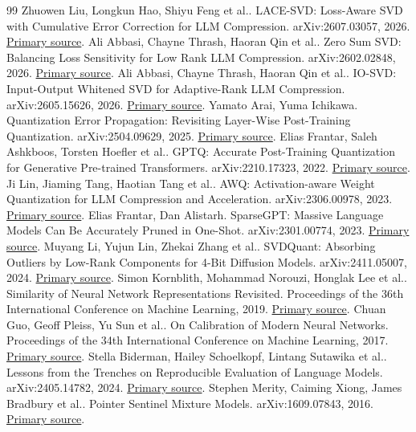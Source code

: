\documentclass[conference]{IEEEtran}
\begin{document}
\begin{thebibliography}{99}
 Zhuowen Liu, Longkun Hao, Shiyu Feng et al.. LACE-SVD: Loss-Aware SVD with Cumulative Error Correction for LLM Compression. arXiv:2607.03057, 2026. \href{https://arxiv.org/abs/2607.03057}{Primary source}.
 Ali Abbasi, Chayne Thrash, Haoran Qin et al.. Zero Sum SVD: Balancing Loss Sensitivity for Low Rank LLM Compression. arXiv:2602.02848, 2026. \href{https://arxiv.org/abs/2602.02848}{Primary source}.
 Ali Abbasi, Chayne Thrash, Haoran Qin et al.. IO-SVD: Input-Output Whitened SVD for Adaptive-Rank LLM Compression. arXiv:2605.15626, 2026. \href{https://arxiv.org/abs/2605.15626}{Primary source}.
 Yamato Arai, Yuma Ichikawa. Quantization Error Propagation: Revisiting Layer-Wise Post-Training Quantization. arXiv:2504.09629, 2025. \href{https://arxiv.org/abs/2504.09629}{Primary source}.
 Elias Frantar, Saleh Ashkboos, Torsten Hoefler et al.. GPTQ: Accurate Post-Training Quantization for Generative Pre-trained Transformers. arXiv:2210.17323, 2022. \href{https://arxiv.org/abs/2210.17323}{Primary source}.
 Ji Lin, Jiaming Tang, Haotian Tang et al.. AWQ: Activation-aware Weight Quantization for LLM Compression and Acceleration. arXiv:2306.00978, 2023. \href{https://arxiv.org/abs/2306.00978}{Primary source}.
 Elias Frantar, Dan Alistarh. SparseGPT: Massive Language Models Can Be Accurately Pruned in One-Shot. arXiv:2301.00774, 2023. \href{https://arxiv.org/abs/2301.00774}{Primary source}.
 Muyang Li, Yujun Lin, Zhekai Zhang et al.. SVDQuant: Absorbing Outliers by Low-Rank Components for 4-Bit Diffusion Models. arXiv:2411.05007, 2024. \href{https://arxiv.org/abs/2411.05007}{Primary source}.
 Simon Kornblith, Mohammad Norouzi, Honglak Lee et al.. Similarity of Neural Network Representations Revisited. Proceedings of the 36th International Conference on Machine Learning, 2019. \href{https://proceedings.mlr.press/v97/kornblith19a.html}{Primary source}.
 Chuan Guo, Geoff Pleiss, Yu Sun et al.. On Calibration of Modern Neural Networks. Proceedings of the 34th International Conference on Machine Learning, 2017. \href{https://proceedings.mlr.press/v70/guo17a.html}{Primary source}.
 Stella Biderman, Hailey Schoelkopf, Lintang Sutawika et al.. Lessons from the Trenches on Reproducible Evaluation of Language Models. arXiv:2405.14782, 2024. \href{https://arxiv.org/abs/2405.14782}{Primary source}.
 Stephen Merity, Caiming Xiong, James Bradbury et al.. Pointer Sentinel Mixture Models. arXiv:1609.07843, 2016. \href{https://arxiv.org/abs/1609.07843}{Primary source}.

\end{thebibliography}
\end{document}
